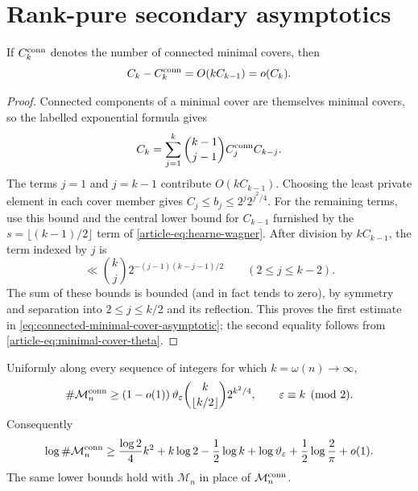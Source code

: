 \section{Rank-pure secondary asymptotics}
\label{sec:supp-rank-pure-asymptotics}

\begin{lemma}
\label{lem:connected-minimal-cover-concentration}
If $C_k^{\rm conn}$ denotes the number of connected minimal covers, then
\begin{equation}\label{eq:connected-minimal-cover-asymptotic}
 C_k-C_k^{\rm conn}=O(kC_{k-1})=o(C_k).
\end{equation}
\end{lemma}

\begin{proof}
Connected components of a minimal cover are themselves minimal covers, so the
labelled exponential formula gives
\[
 C_k=\sum_{j=1}^k\binom{k-1}{j-1}C_j^{\rm conn}C_{k-j}.
\]
The terms $j=1$ and $j=k-1$ contribute $O(kC_{k-1})$. Choosing the least
private element in each cover member gives $C_j\le b_j\le2^j2^{j^2/4}$.
For the remaining terms, use this bound and the central lower bound for
$C_{k-1}$ furnished by the $s=\lfloor(k-1)/2\rfloor$ term of
\eqref{article-eq:hearne-wagner}. After division by $kC_{k-1}$, the term indexed by
$j$ is
\[
 \ll \binom{k}{j}
 2^{-(j-1)(k-j-1)/2}\qquad(2\le j\le k-2).
\]
The sum of these bounds is bounded (and in fact tends to zero), by symmetry
and separation into $2\le j\le k/2$ and its reflection. This proves the first
estimate in \eqref{eq:connected-minimal-cover-asymptotic}; the second equality
follows from \eqref{article-eq:minimal-cover-theta}.
\end{proof}

\begin{corollary}
\label{cor:theta-refined-connected-entropy}
Uniformly along every sequence of integers for which $k=\omega(n)\to\infty$,
\begin{equation}\label{eq:theta-connected-lower-bound}
 \#\mathcal M_n^{\rm conn}\ge
 (1-o(1))\,
 \vartheta_\varepsilon\binom{k}{\lfloor k/2\rfloor}2^{k^2/4},
 \qquad \varepsilon\equiv k\pmod2.
\end{equation}
Consequently
\begin{equation}\label{eq:theta-connected-log-lower-bound}
 \log\#\mathcal M_n^{\rm conn}\ge
 \frac{\log2}{4}k^2+k\log2-\frac12\log k
 +\log\vartheta_\varepsilon+\frac12\log\frac2\pi+o(1).
\end{equation}
The same lower bounds hold with $\mathcal M_n$ in place of
$\mathcal M_n^{\rm conn}$.
\end{corollary}

